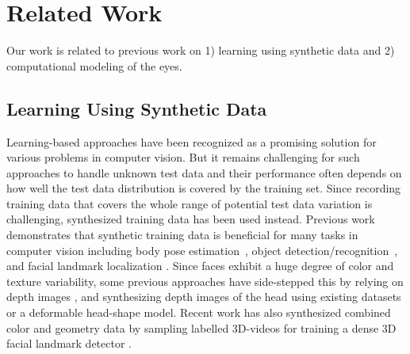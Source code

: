 
\section{Related Work}

Our work is related to previous work on 1) learning using synthetic data and 2) computational modeling of the eyes.

\subsection{Learning Using Synthetic Data}

Learning-based approaches have been recognized as a promising solution for various problems in computer vision.
But it remains challenging for such approaches to handle unknown test data and their performance often depends on how well the test data distribution is covered by the training set.
Since recording training data that covers the whole range of potential test data variation is challenging,
synthesized training data has been used instead.
Previous work demonstrates that synthetic training data is beneficial for many tasks in computer vision including body pose estimation~\cite{okada2008relevant,shotton2013real}, object detection/recognition~\cite{yu2010improving,liebelt2010multiview}, and facial landmark localization \cite{kaneva2011evaluation,baltrusaitis20123d,zface}.
%
Since faces exhibit a huge degree of color and texture variability, some previous approaches have side-stepped this by relying on depth images \cite{baltrusaitis20123d,fanelli2011real}, and synthesizing depth images of the head using existing datasets or a deformable head-shape model. Recent work has also synthesized combined color and geometry data by sampling labelled 3D-videos for training a dense 3D facial landmark detector \cite{zface}.


